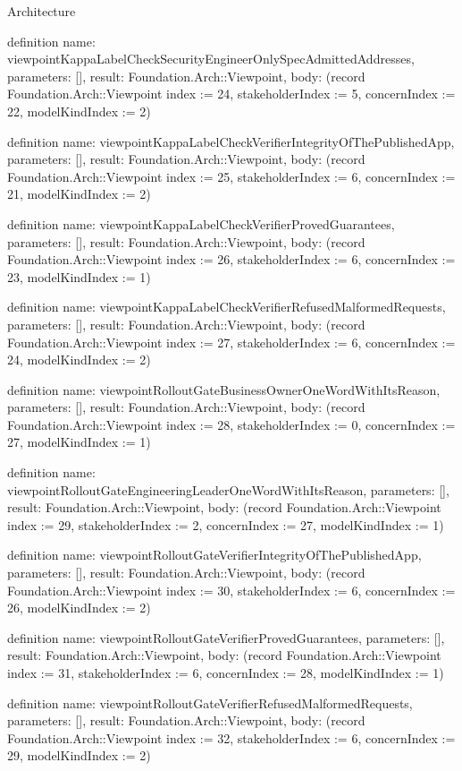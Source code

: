 \begin{lexlean}{Architecture}
\begin{semanticmodule}
definition{
  name: viewpointKappaLabelCheckSecurityEngineerOnlySpecAdmittedAddresses,
  parameters: [],
  result: Foundation.Arch::Viewpoint,
  body: (record Foundation.Arch::Viewpoint {index := 24, stakeholderIndex := 5, concernIndex := 22, modelKindIndex := 2})
}

definition{
  name: viewpointKappaLabelCheckVerifierIntegrityOfThePublishedApp,
  parameters: [],
  result: Foundation.Arch::Viewpoint,
  body: (record Foundation.Arch::Viewpoint {index := 25, stakeholderIndex := 6, concernIndex := 21, modelKindIndex := 2})
}

definition{
  name: viewpointKappaLabelCheckVerifierProvedGuarantees,
  parameters: [],
  result: Foundation.Arch::Viewpoint,
  body: (record Foundation.Arch::Viewpoint {index := 26, stakeholderIndex := 6, concernIndex := 23, modelKindIndex := 1})
}

definition{
  name: viewpointKappaLabelCheckVerifierRefusedMalformedRequests,
  parameters: [],
  result: Foundation.Arch::Viewpoint,
  body: (record Foundation.Arch::Viewpoint {index := 27, stakeholderIndex := 6, concernIndex := 24, modelKindIndex := 2})
}

definition{
  name: viewpointRolloutGateBusinessOwnerOneWordWithItsReason,
  parameters: [],
  result: Foundation.Arch::Viewpoint,
  body: (record Foundation.Arch::Viewpoint {index := 28, stakeholderIndex := 0, concernIndex := 27, modelKindIndex := 1})
}

definition{
  name: viewpointRolloutGateEngineeringLeaderOneWordWithItsReason,
  parameters: [],
  result: Foundation.Arch::Viewpoint,
  body: (record Foundation.Arch::Viewpoint {index := 29, stakeholderIndex := 2, concernIndex := 27, modelKindIndex := 1})
}

definition{
  name: viewpointRolloutGateVerifierIntegrityOfThePublishedApp,
  parameters: [],
  result: Foundation.Arch::Viewpoint,
  body: (record Foundation.Arch::Viewpoint {index := 30, stakeholderIndex := 6, concernIndex := 26, modelKindIndex := 2})
}

definition{
  name: viewpointRolloutGateVerifierProvedGuarantees,
  parameters: [],
  result: Foundation.Arch::Viewpoint,
  body: (record Foundation.Arch::Viewpoint {index := 31, stakeholderIndex := 6, concernIndex := 28, modelKindIndex := 1})
}

definition{
  name: viewpointRolloutGateVerifierRefusedMalformedRequests,
  parameters: [],
  result: Foundation.Arch::Viewpoint,
  body: (record Foundation.Arch::Viewpoint {index := 32, stakeholderIndex := 6, concernIndex := 29, modelKindIndex := 2})
}


\end{semanticmodule}
\end{lexlean}
